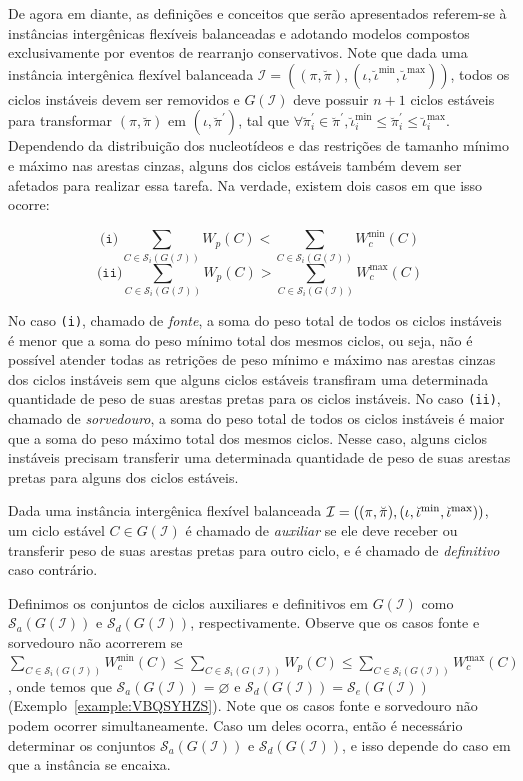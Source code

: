 De agora em diante, as definições e conceitos que serão apresentados referem-se à instâncias intergênicas flexíveis balanceadas e adotando modelos compostos exclusivamente por eventos de rearranjo conservativos. Note que dada uma instância intergênica flexível balanceada $\mathcal{I} = ((\pi,\breve\pi),(\iota,\breve\iota^{\min},\breve\iota^{\max}))$, todos os ciclos instáveis devem ser removidos e $G(\mathcal{I})$ deve possuir $n+1$ ciclos estáveis para transformar $(\pi,\breve\pi)$ em $(\iota,\breve\pi^{\prime})$, tal que $\forall \breve\pi^{\prime}_i \in \breve\pi^{\prime}, \breve\iota^{\min}_i \le \breve\pi^{\prime}_i \le \breve\iota^{\max}_i$. Dependendo da distribuição dos nucleotídeos e das restrições de tamanho mínimo e máximo nas arestas cinzas, alguns dos ciclos estáveis também devem ser afetados para realizar essa tarefa. Na verdade, existem dois casos em que isso ocorre:

$$\texttt{(i)}~\sum_{C \in \mathcal{S}_i(G(\mathcal{I}))} W_p(C) < \sum_{C \in \mathcal{S}_i(G(\mathcal{I}))} W^{\min}_c(C)$$
$$\texttt{(ii)}\sum_{C \in \mathcal{S}_i(G(\mathcal{I}))} W_p(C) > \sum_{C \in \mathcal{S}_i(G(\mathcal{I}))} W^{\max}_c(C)$$

No caso \texttt{(i)}, chamado de \emph{fonte}, a soma do peso total de todos os ciclos instáveis é menor que a soma do peso mínimo total dos mesmos ciclos, ou seja, não é possível atender todas as retrições de peso mínimo e máximo nas arestas cinzas dos ciclos instáveis sem que alguns ciclos estáveis transfiram uma determinada quantidade de peso de suas arestas pretas para os ciclos instáveis. No caso \texttt{(ii)}, chamado de \emph{sorvedouro}, a soma do peso total de todos os ciclos instáveis é maior que a soma do peso máximo total dos mesmos ciclos. Nesse caso, alguns ciclos instáveis precisam transferir uma determinada quantidade de peso de suas arestas pretas para alguns dos ciclos estáveis.

\begin{definition}
Dada uma instância intergênica flexível balanceada $\mathcal{I} = ((\pi,\breve\pi),\break(\iota,\breve\iota^{\min},\breve\iota^{\max}))$, um ciclo estável $C \in G(\mathcal{I})$ é chamado de \emph{auxiliar} se ele deve receber ou transferir peso de suas arestas pretas para outro ciclo, e é chamado de \emph{definitivo} caso contrário.
\end{definition}

Definimos os conjuntos de ciclos auxiliares e definitivos em $G(\mathcal{I})$ como $\mathcal{S}_a(G(\mathcal{I}))$ e $\mathcal{S}_d(G(\mathcal{I}))$, respectivamente. Observe que os casos fonte e sorvedouro não acorrerem se $\sum_{C \in \mathcal{S}_i(G(\mathcal{I}))} W^{\min}_c(C) \le \sum_{C \in \mathcal{S}_i(G(\mathcal{I}))} W_p(C) \le \sum_{C \in \mathcal{S}_i(G(\mathcal{I}))} W^{\max}_c(C)$, onde temos que $\mathcal{S}_a(G(\mathcal{I})) = \varnothing$ e $\mathcal{S}_d(G(\mathcal{I})) = \mathcal{S}_e(G(\mathcal{I}))$ (Exemplo~\ref{example:VBQSYHZS}). Note que os casos fonte e sorvedouro não podem ocorrer simultaneamente. Caso um deles ocorra, então é necessário determinar os conjuntos $\mathcal{S}_a(G(\mathcal{I}))$ e $\mathcal{S}_d(G(\mathcal{I}))$, e isso depende do caso em que a instância se encaixa. 

